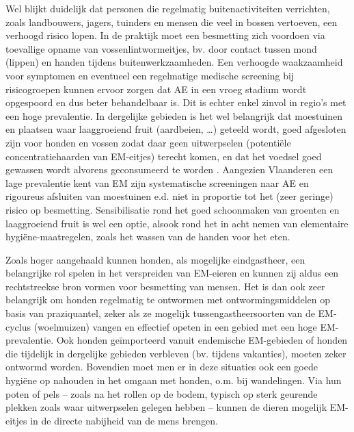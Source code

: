 \documentclass[twoside]{extreport}
\begin{document}
Wel blijkt duidelijk dat personen die regelmatig buitenactiviteiten
verrichten, zoals landbouwers, jagers, tuinders en mensen die veel in
bossen vertoeven, een verhoogd risico lopen. In de praktijk moet een
besmetting zich voordoen via toevallige opname van vossenlintwormeitjes,
bv. door contact tussen mond (lippen) en handen tijdens
buitenwerkzaamheden. Een verhoogde waakzaamheid voor symptomen en
eventueel een regelmatige medische screening bij risicogroepen kunnen
ervoor zorgen dat AE in een vroeg stadium wordt opgespoord en dus beter
behandelbaar is. Dit is echter enkel zinvol in regio's met een hoge
prevalentie. In dergelijke gebieden is het wel belangrijk dat moestuinen
en plaatsen waar laaggroeiend fruit (aardbeien, \ldots{}) geteeld wordt,
goed afgesloten zijn voor honden en vossen zodat daar geen uitwerpselen
(potentiële concentratiehaarden van EM-eitjes) terecht komen, en dat het
voedsel goed gewassen wordt alvorens geconsumeerd te worden
\citep{kreidl1998domestic, kern2004risk, piarroux2013populations}.
Aangezien Vlaanderen een lage prevalentie kent van EM zijn systematische
screeningen naar AE en rigoureus afsluiten van moestuinen e.d. niet in
proportie tot het (zeer geringe) risico op besmetting. Sensibilisatie
rond het goed schoonmaken van groenten en laaggroeiend fruit is wel een
optie, alsook rond het in acht nemen van elementaire
hygiëne-maatregelen, zoals het wassen van de handen voor het eten.

Zoals hoger aangehaald kunnen honden, als mogelijke eindgastheer, een
belangrijke rol spelen in het verspreiden van EM-eieren en kunnen zij
aldus een rechtstreekse bron vormen voor besmetting van mensen. Het is
dan ook zeer belangrijk om honden regelmatig te ontwormen met
ontwormingsmiddelen op basis van praziquantel, zeker als ze mogelijk
tussengastheersoorten van de EM-cyclus (woelmuizen) vangen en effectief
opeten in een gebied met een hoge EM-prevalentie. Ook honden
geïmporteerd vanuit endemische EM-gebieden of honden die tijdelijk in
dergelijke gebieden verbleven (bv. tijdens vakanties), moeten zeker
ontwormd worden. Bovendien moet men er in deze situaties ook een goede
hygiëne op nahouden in het omgaan met honden, o.m. bij wandelingen. Via
hun poten of pels -- zoals na het rollen op de bodem, typisch op sterk
geurende plekken zoals waar uitwerpselen gelegen hebben -- kunnen de
dieren mogelijk EM-eitjes in de directe nabijheid van de mens brengen.
\end{document}
